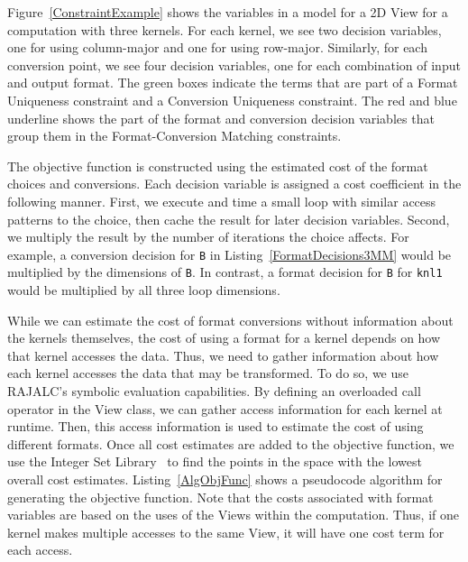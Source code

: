 \documentclass[sigconf,review=true]{acmart}
\begin{document}
Figure~\ref{ConstraintExample} shows the variables in a model for a 2D View for a computation with three kernels. 
For each kernel, we see two decision variables, one for using column-major and one for using row-major. 
Similarly, for each conversion point, we see four decision variables, one for each combination of input and output format. 
The green boxes indicate the terms that are part of a Format Uniqueness constraint and a Conversion Uniqueness constraint.
The red and blue underline shows the part of the format and conversion decision variables that group them in the Format-Conversion Matching constraints. 

The objective function is constructed using the estimated cost of the format choices and conversions. 
Each decision variable is assigned a cost coefficient in the following manner.
First, we execute and time a small loop with similar access patterns to the choice, then cache the result for later decision variables.
Second, we multiply the result by the number of iterations the choice affects.
For example, a conversion decision for \verb.B. in Listing~\ref{FormatDecisions3MM} would be multiplied by the dimensions of \verb.B..
In contrast, a format decision for \verb.B. for \verb.knl1. would be multiplied by all three loop dimensions. 

While we can estimate the cost of format conversions without information about the kernels themselves, the cost of using a format for a kernel depends on how that kernel accesses the data.
Thus, we need to gather information about how each kernel accesses the data that may be transformed. 
To do so, we use RAJALC's symbolic evaluation capabilities. 
By defining an overloaded call operator in the View class, we can gather access information for each kernel at runtime. 
Then, this access information is used to estimate the cost of using different formats. 
Once all cost estimates are added to the objective function, we use the Integer Set Library~\cite{verdoolaege2010isl} to find the points in the space with the lowest overall cost estimates. 
Listing~\ref{AlgObjFunc} shows a pseudocode algorithm for generating the objective function.
Note that the costs associated with format variables are based on the uses of the Views within the computation. 
Thus, if one kernel makes multiple accesses to the same View, it will have one cost term for each access.
\end{document}
